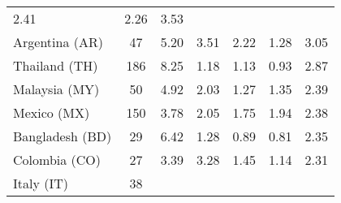 \begin{table}[t]
{\begin{tabular}{lcccccc}
    \color[HTML]{000000} \color{black} 2.41 & {\cellcolor[HTML]{F7FBFF}}
    \color[HTML]{000000} \color{black} 2.26 & \color{black} 3.53 \\
    Argentina (AR) & \color{black} 47 & {\cellcolor[HTML]{6CAED6}}
    \color[HTML]{F1F1F1} \color{black} 5.20 & {\cellcolor[HTML]{BCD7EB}}
    \color[HTML]{000000} \color{black} 3.51 & {\cellcolor[HTML]{DFECF7}}
    \color[HTML]{000000} \color{black} 2.22 & {\cellcolor[HTML]{F7FBFF}}
    \color[HTML]{000000} \color{black} 1.28 & \color{black} 3.05 \\
    Thailand (TH) & \color{black} 186 & {\cellcolor[HTML]{6AAED6}}
    \color[HTML]{F1F1F1} \color{black} 8.25 & {\cellcolor[HTML]{F4F9FE}}
    \color[HTML]{000000} \color{black} 1.18 & {\cellcolor[HTML]{F5F9FE}}
    \color[HTML]{000000} \color{black} 1.13 & {\cellcolor[HTML]{F7FBFF}}
    \color[HTML]{000000} \color{black} 0.93 & \color{black} 2.87 \\
    Malaysia (MY) & \color{black} 50 & {\cellcolor[HTML]{6AAED6}}
    \color[HTML]{F1F1F1} \color{black} 4.92 & {\cellcolor[HTML]{E3EEF8}}
    \color[HTML]{000000} \color{black} 2.03 & {\cellcolor[HTML]{F7FBFF}}
    \color[HTML]{000000} \color{black} 1.27 & {\cellcolor[HTML]{F5FAFE}}
    \color[HTML]{000000} \color{black} 1.35 & \color{black} 2.39 \\
    Mexico (MX) & \color{black} 150 & {\cellcolor[HTML]{6AAED6}}
    \color[HTML]{F1F1F1} \color{black} 3.78 & {\cellcolor[HTML]{E9F2FA}}
    \color[HTML]{000000} \color{black} 2.05 & {\cellcolor[HTML]{F7FBFF}}
    \color[HTML]{000000} \color{black} 1.75 & {\cellcolor[HTML]{EEF5FC}}
    \color[HTML]{000000} \color{black} 1.94 & \color{black} 2.38 \\
    Bangladesh (BD) & \color{black} 29 & {\cellcolor[HTML]{6AAED6}}
    \color[HTML]{F1F1F1} \color{black} 6.42 & {\cellcolor[HTML]{EFF6FC}}
    \color[HTML]{000000} \color{black} 1.28 & {\cellcolor[HTML]{F6FAFF}}
    \color[HTML]{000000} \color{black} 0.89 & {\cellcolor[HTML]{F7FBFF}}
    \color[HTML]{000000} \color{black} 0.81 & \color{black} 2.35 \\
    Colombia (CO) & \color{black} 27 & {\cellcolor[HTML]{6AAED6}}
    \color[HTML]{F1F1F1} \color{black} 3.39 & {\cellcolor[HTML]{75B4D8}}
    \color[HTML]{000000} \color{black} 3.28 & {\cellcolor[HTML]{EAF2FB}}
    \color[HTML]{000000} \color{black} 1.45 & {\cellcolor[HTML]{F7FBFF}}
    \color[HTML]{000000} \color{black} 1.14 & \color{black} 2.31 \\
    Italy (IT) & \color{black} 38 & {\cellcolor[HTML]{B7D4EA}}

\end{tabular}}
\end{table}

